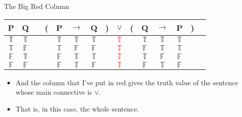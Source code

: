 \documentclass[
  ignorenonframetext,
]{beamer}
\providecommand{\tightlist}{%
  \setlength{\itemsep}{0pt}\setlength{\parskip}{0pt}}
\renewcommand{\,}{\text{, }}
\def\True{\mathbb{T}}
\def\False{\mathbb{F}}
\begin{document}
\begin{frame}{The Big Red Column}
\protect\hypertarget{the-big-red-column}{}

\begin{center}
\begin{tabular}{@{ }c@{ }@{ }c | c@{ }@{}c@{}@{ }c@{ }@{ }c@{ }@{ }c@{ }@{}c@{}@{ }c@{ }@{}c@{}@{ }c@{ }@{ }c@{ }@{ }c@{ }@{}c@{}@{ }c}
P & Q &  & ( & P & $\rightarrow$ & Q & ) & $\lor$ & ( & Q & $\rightarrow$ & P & ) & \\
\hline 
$\True$ & $\True$ &  &  & $\True$ & $\True$ & $\True$ &  & \textcolor{red}{$\True$} &  & $\True$ & $\True$ & $\True$ &  & \\
$\True$ & $\False$ &  &  & $\True$ & $\False$ & $\False$ &  & \textcolor{red}{$\True$} &  & $\False$ & $\True$ & $\True$ &  & \\
$\False$ & $\True$ &  &  & $\False$ & $\True$ & $\True$ &  & \textcolor{red}{$\True$} &  & $\True$ & $\False$ & $\False$ &  & \\
$\False$ & $\False$ &  &  & $\False$ & $\True$ & $\False$ &  & \textcolor{red}{$\True$} &  & $\False$ & $\True$ & $\False$ &  & \\
\end{tabular}
\bigskip
\end{center}

\begin{itemize}
\tightlist
\item
  And the column that I've put in red gives the truth value of the
  sentence whose main connective is \(\vee\).
\item
  That is, in this case, the whole sentence.
\end{itemize}

\end{frame}
\end{document}
